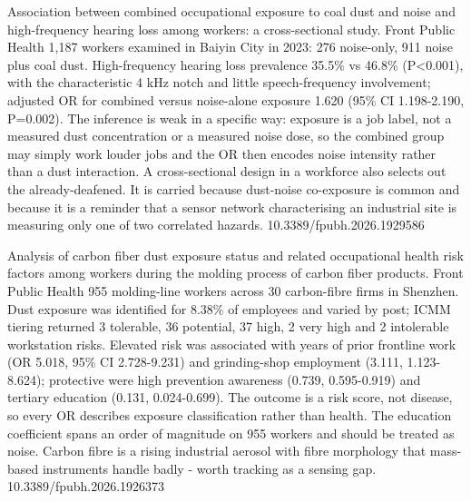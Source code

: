 \documentclass[10pt]{article}
\begin{document}
{Association between combined occupational exposure to coal dust and noise and high-frequency hearing loss among workers: a cross-sectional study.}
{Front Public Health}
{1,187 workers examined in Baiyin City in 2023: 276 noise-only, 911 noise plus coal dust. High-frequency hearing loss prevalence 35.5\% vs 46.8\% (P<0.001), with the characteristic 4 kHz notch and little speech-frequency involvement; adjusted OR for combined versus noise-alone exposure 1.620 (95\% CI 1.198-2.190, P=0.002). The inference is weak in a specific way: exposure is a job label, not a measured dust concentration or a measured noise dose, so the combined group may simply work louder jobs and the OR then encodes noise intensity rather than a dust interaction. A cross-sectional design in a workforce also selects out the already-deafened. It is carried because dust-noise co-exposure is common and because it is a reminder that a sensor network characterising an industrial site is measuring only one of two correlated hazards.}
{10.3389/fpubh.2026.1929586}

{Analysis of carbon fiber dust exposure status and related occupational health risk factors among workers during the molding process of carbon fiber products.}
{Front Public Health}
{955 molding-line workers across 30 carbon-fibre firms in Shenzhen. Dust exposure was identified for 8.38\% of employees and varied by post; ICMM tiering returned 3 tolerable, 36 potential, 37 high, 2 very high and 2 intolerable workstation risks. Elevated risk was associated with years of prior frontline work (OR 5.018, 95\% CI 2.728-9.231) and grinding-shop employment (3.111, 1.123-8.624); protective were high prevention awareness (0.739, 0.595-0.919) and tertiary education (0.131, 0.024-0.699). The outcome is a risk score, not disease, so every OR describes exposure classification rather than health. The education coefficient spans an order of magnitude on 955 workers and should be treated as noise. Carbon fibre is a rising industrial aerosol with fibre morphology that mass-based instruments handle badly - worth tracking as a sensing gap.}
{10.3389/fpubh.2026.1926373}

\end{document}
